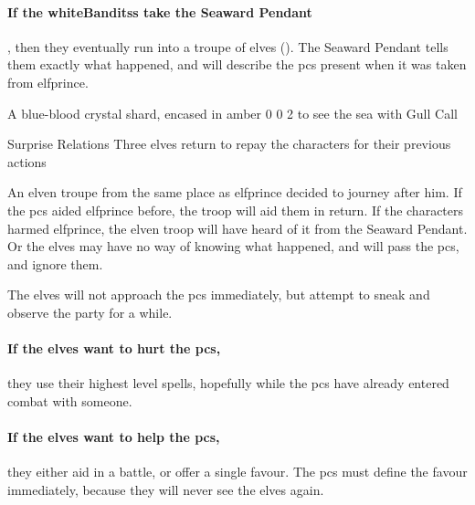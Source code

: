 \paragraph{If the \glspl{whiteBandits} take the Seaward Pendant},
then they eventually run into a troupe of elves ().
The Seaward Pendant tells them exactly what happened, and will describe the \glspl{pc} present when it was taken from \gls{elfprince}.

  {A blue-blood crystal shard, encased in amber}%
  {0}%
  {0}%
  {2}%
  {to see the sea with }%
  {Gull Call}%
  {
    \setcounter{Water}{3}
    \setcounter{Vigilance}{2}
    \setcounter{Performance}{1}
    \setcounter{Wyldcrafting}{1}
  }%

\showStdSpells

{\squash Surprise Relations}%
{Three elves return to repay the characters for their previous actions}%
\label{karmaElves}

An elven troupe from the same place as \gls{elfprince} decided to journey after him.
If the \glspl{pc} aided \gls{elfprince} before, the troop will aid them in return.
If the characters harmed \gls{elfprince}, the elven troop will have heard of it from the Seaward Pendant.
Or the elves may have no way of knowing what happened, and will pass the \glspl{pc}, and ignore them.

The elves will not approach the \glspl{pc} immediately, but attempt to sneak and observe the party for a while.

\paragraph{If the elves want to hurt the \glspl{pc},}
they use their highest level spells, hopefully while the \glspl{pc} have already entered combat with someone.

\paragraph{If the elves want to help the \glspl{pc},}
they either aid in a battle, or offer a single favour.
The \glspl{pc} must define the favour immediately, because they will never see the elves again.



